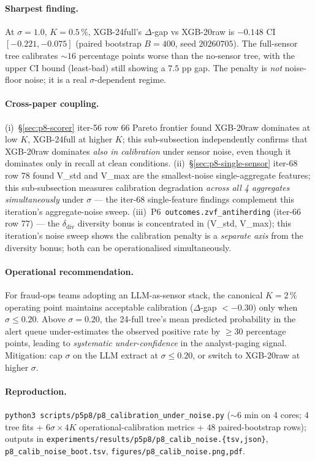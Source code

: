 \paragraph{Sharpest finding.}
At $\sigma{=}1.0$, $K{=}0.5\,\%$, XGB-24full's $\Delta$-gap vs
XGB-20raw is $\mathbf{-0.148}$ CI $[-0.221, -0.075]$ (paired
bootstrap $B{=}400$, seed $20260705$). The full-sensor tree
calibrates $\sim 16$ percentage points worse than the no-sensor tree,
with the upper CI bound (least-bad) still showing a $7.5$ pp gap.
The penalty is \emph{not} noise-floor noise; it is a real
$\sigma$-dependent regime.

\paragraph{Cross-paper coupling.}
(i)~\S\ref{sec:p8-scorer} iter-56 row 66 Pareto frontier found
XGB-20raw dominates at low $K$, XGB-24full at higher $K$; this
sub-subsection independently confirms that XGB-20raw dominates
\emph{also in calibration} under sensor noise, even though it
dominates only in recall at clean conditions. (ii)~\S\ref{sec:p8-single-sensor}
iter-68 row 78 found V\_std and V\_max are the smallest-noise
single-aggregate features; this sub-subsection measures
calibration degradation \emph{across all 4 aggregates simultaneously}
under $\sigma$ — the iter-68 single-feature findings complement
this iteration's aggregate-noise sweep. (iii)~P6~\texttt{outcomes.zvf\_antiherding}
(iter-66 row 77) — the $\delta_{\mathrm{div}}$ diversity bonus is
concentrated in (V\_std, V\_max); this iteration's noise sweep shows
the calibration penalty is a \emph{separate axis} from the diversity
bonus; both can be operationalised simultaneously.

\paragraph{Operational recommendation.}
For fraud-ops teams adopting an LLM-as-sensor stack, the canonical
$K{=}2\,\%$ operating point maintains acceptable calibration
($\Delta$-gap $< -0.30$) only when $\sigma \leq 0.20$. Above
$\sigma{=}0.20$, the 24-full tree's mean predicted probability in the
alert queue under-estimates the observed positive rate by
$\geq 30$ percentage points, leading to \emph{systematic
under-confidence} in the analyst-paging signal. Mitigation: cap
$\sigma$ on the LLM extract at $\sigma \leq 0.20$, or switch to
XGB-20raw at higher $\sigma$.

\paragraph{Reproduction.}
\texttt{python3 scripts/p5p8/p8\_calibration\_under\_noise.py}
($\sim 6$ min on 4 cores; $4$ tree fits + $6 \sigma \times 4 K$
operational-calibration metrics + $48$ paired-bootstrap rows);
outputs in
\texttt{experiments/results/p5p8/p8\_calib\_noise.\{tsv,json\}},
\texttt{p8\_calib\_noise\_boot.tsv},
\texttt{figures/p8\_calib\_noise.{png,pdf}}.

